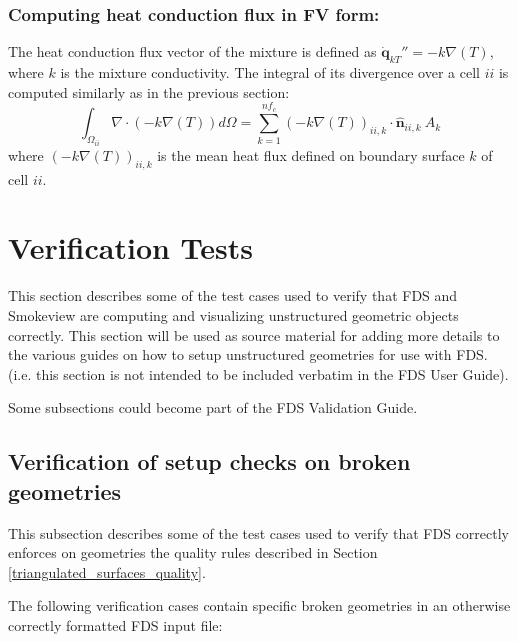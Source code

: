 \documentclass[12pt]{article}
\begin{document}
\subsubsection{Computing heat conduction flux in FV form:}


The heat conduction flux vector of the mixture is defined as $\dot{\mathbf{q}}_{kT}''= -k \nabla(T)$, where $k$ is the mixture conductivity. The integral of its divergence over a cell $ii$ is computed similarly as in the previous section:
\begin{equation}
    \int_{\Omega_{ii}} {\nabla \cdot \left(-k \nabla(T)\right)} d\Omega = \sum_{k=1}^{nf_c} \left(-k \nabla(T) \right)_{ii,k} \cdot \hat{\mathbf{n}}_{ii,k}  \: A_k
\end{equation}
where $\left(-k \nabla(T) \right)_{ii,k}$ is the mean heat flux defined on boundary surface $k$ of cell $ii$.






\clearpage



\section{Verification Tests}

This section describes some of the test cases used to verify that FDS and Smokeview are computing
and visualizing unstructured geometric objects correctly.  This section will be used as source material for adding
more details to the various guides on how to setup unstructured geometries for use with FDS. (i.e. this section
is not intended to be included verbatim in the FDS User Guide).

Some subsections could become part of the FDS Validation Guide.

\newcommand{\figheightD}{2.75in}

\subsection{Verification of setup checks on broken geometries}

This subsection describes some of the test cases used to verify that FDS correctly enforces on geometries
the quality rules described in Section \ref{triangulated_surfaces_quality}.

The following verification cases contain specific broken geometries in an otherwise correctly
formatted FDS input file:
\end{document}
